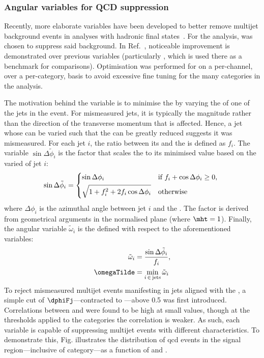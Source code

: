 

\subsubsection{Angular variables for QCD suppression}
\label{subsubsec:htoinv_ang_var_optimisation}

Recently, more elaborate variables have been developed to better remove multijet background events in analyses with hadronic final states~\cite{Sakuma:2018xrq}. For the analysis, \omegaTilde was chosen to suppress said background. In Ref.~, noticeable improvement is demonstrated over previous variables (particularly \biasedDPhi, which is used there as a benchmark for comparisons). Optimisation was performed for \omegaTilde on a per-channel, over a per-category, basis to avoid excessive fine tuning for the many categories in the analysis.

The motivation behind the variable \omegaTilde is to minimise the \mht by varying the \pt of one of the \glspl{jet} in the event. For mismeasured \glspl{jet}, it is typically the magnitude rather than the direction of the transverse momentum that is affected. Hence, a \gls{jet} whose \pt can be varied such that the \mht can be greatly reduced suggests it was mismeasured. For each jet $i$, the ratio between its \pt and the \mht is defined as $f_i$. The variable $\sin\Delta\tilde{\phi}_i$ is the factor that scales the \mht to its minimised value based on the varied \pt of jet $i$:
\begin{align}
\sin\Delta\tilde{\phi}_i = \begin{dcases*}
\sin\Delta\phi_i & if $f_i + \cos\Delta\phi_i \geq 0$, \\
\sqrt{1 + f_i^2 + 2 f_i \cos\Delta\phi_i} & otherwise\\
\end{dcases*}
\end{align}
where $\Delta\phi_i$ is the azimuthal angle between \gls{jet} $i$ and the \htvecmiss. The factor is derived from geometrical arguments in the normalised \pt plane (where $\mht = \text{1}$). Finally, the angular variable $\tilde{\omega}_i$ is the defined with respect to the aforementioned variables:
\begin{equation}
    \begin{aligned}
\tilde{\omega}_i &= \frac{ \sin\Delta\tilde{\phi}_i }{ f_i },\\
\omegaTilde &= \min_{i \, \in \, \mathrm{jets}} \tilde{\omega}_i
    \end{aligned}
\end{equation}
To reject mismeasured multijet events manifesting in \glspl{jet} aligned with the \ptvecmiss, a simple cut of $\dphiFj$---contracted to \mindphi---above 0.5 was first introduced. Correlations between \mindphi and \omegaTilde were found to be high at small values, though at the thresholds applied to the categories the correlation is weaker. As such, each variable is capable of suppressing multijet events with different characteristics. To demonstrate this, Fig. illustrates the distribution of \acrshort{qcd} events in the signal region---inclusive of category---as a function of \omegaTilde and \mindphi.

